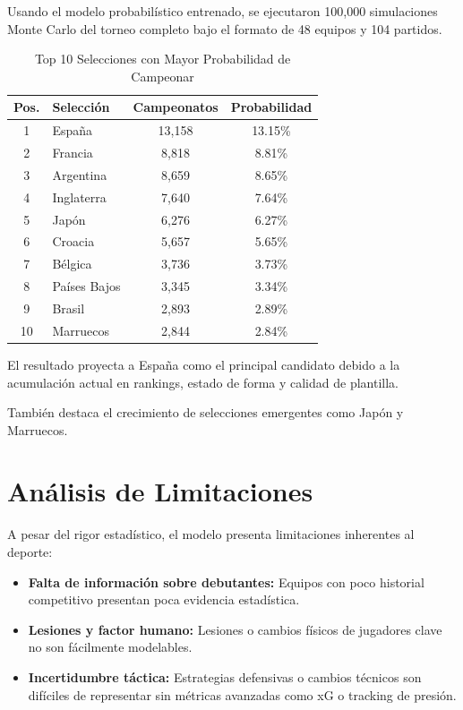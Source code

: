 \documentclass[conference]{IEEEtran}
\begin{document}
	Usando el modelo probabilístico entrenado, se ejecutaron 100,000 simulaciones Monte Carlo del torneo completo bajo el formato de 48 equipos y 104 partidos.
	
	\begin{table}[h]
		\centering
		\caption{Top 10 Selecciones con Mayor Probabilidad de Campeonar}
		\begin{tabular}{clcc}
			\toprule
			\textbf{Pos.} & \textbf{Selección} & \textbf{Campeonatos} & \textbf{Probabilidad} \\
			\midrule
			1 & España & 13,158 & 13.15\% \\
			2 & Francia & 8,818 & 8.81\% \\
			3 & Argentina & 8,659 & 8.65\% \\
			4 & Inglaterra & 7,640 & 7.64\% \\
			5 & Japón & 6,276 & 6.27\% \\
			6 & Croacia & 5,657 & 5.65\% \\
			7 & Bélgica & 3,736 & 3.73\% \\
			8 & Países Bajos & 3,345 & 3.34\% \\
			9 & Brasil & 2,893 & 2.89\% \\
			10 & Marruecos & 2,844 & 2.84\% \\
			\bottomrule
		\end{tabular}
	\end{table}
	
	El resultado proyecta a España como el principal candidato debido a la acumulación actual en rankings, estado de forma y calidad de plantilla.
	
	También destaca el crecimiento de selecciones emergentes como Japón y Marruecos.
	
	\section{Análisis de Limitaciones}
	
	A pesar del rigor estadístico, el modelo presenta limitaciones inherentes al deporte:
	
	\begin{itemize}
		\item \textbf{Falta de información sobre debutantes:} Equipos con poco historial competitivo presentan poca evidencia estadística.
		
		\item \textbf{Lesiones y factor humano:} Lesiones o cambios físicos de jugadores clave no son fácilmente modelables.
		
		\item \textbf{Incertidumbre táctica:} Estrategias defensivas o cambios técnicos son difíciles de representar sin métricas avanzadas como xG o tracking de presión.
	\end{itemize}
	
\end{document}
